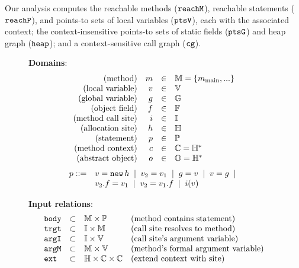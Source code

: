 Our analysis computes the reachable methods ($\text{\tt reachM}$), reachable statements ($\text{\tt reachP}$), and
points-to sets of local variables ($\text{\tt ptsV}$), each with the associated context;
the context-insensitive points-to sets of static fields ($\text{\tt ptsG}$) and
heap graph ($\text{\tt heap}$); and a context-sensitive call graph ($\text{\tt cg}$).

\begin{figure*}
\begin{minipage}{3.3in}
{\bf Domains}: \\
\[
\begin{array}{rrcl}
\mbox{{(method)}}                  & m   &\in & {\mathbb M} = \{ m_\text{main}, ... \}\\
\mbox{{(local variable)}}          & v   &\in & {\mathbb V} \\
\mbox{{(global variable)}}         & g   &\in & {\mathbb G}  \\
\mbox{{(object field)}}            & f   &\in & {\mathbb F}  \\
\mbox{{(method call site)}}        & i   &\in & {\mathbb I} \\
\mbox{{(allocation site)}}         & h   &\in & {\mathbb H} \\
\mbox{{(statement)}}               & p   &\in & {\mathbb P} \\
\mbox{{(method context)}}          & c   &\in& {\mathbb C} = {\mathbb H}^* \\
\mbox{{(abstract object)}}         & o   &\in& {\mathbb O} = {\mathbb H}^* \\
\end{array}
\]
\[
\begin{array}{ll}
p ::= & v = \text{\tt new}\,h \;\mid\; v_2 = v_1 \;\mid\; g = v \;\mid\; v = g \;\mid\; \\
      & v_2.f = v_1 \;\mid\; v_2 = v_1.f  \;\mid\; i(v)
\end{array}
\]
\end{minipage}
\begin{minipage}{3.7in}
{\bf Input relations}: \\
\[ \begin{array}{lcll}
\text{\tt body}     &\subset& {\mathbb M} \times {\mathbb P} & \text{(method contains statement)} \\
\text{\tt trgt}     &\subset& {\mathbb I} \times {\mathbb M} & \text{(call site resolves to method)} \\
\text{\tt argI}     &\subset& {\mathbb I} \times {\mathbb V} & \text{(call site's argument variable)} \\
\text{\tt argM}     &\subset& {\mathbb M} \times {\mathbb V} & \text{(method's formal argument variable)} \\
\text{\tt ext}      &\subset& {\mathbb H} \times {\mathbb C} \times {\mathbb C} & \text{(extend context with site)} \\

\end{array}\]
\end{minipage}
\end{figure*}

